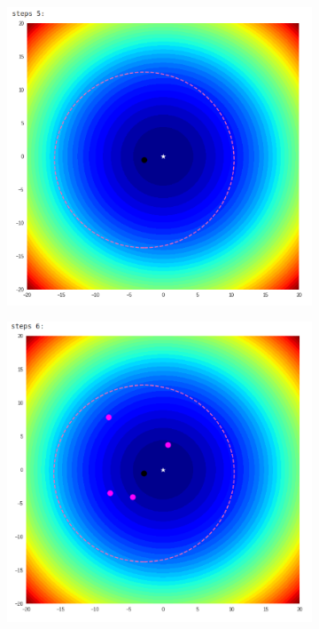 \documentclass{book}
\begin{document}
\begin{itemize}
\begin{figure}[H]
\begin{figure}[H]
\begin{minipage}[c]{0.3\textwidth}
            \end{minipage}
            \begin{minipage}[c]{0.3\textwidth}
                \centering
                \includegraphics[width=\textwidth]{images/one_plus_lambda_ex_step_5.png}
            \end{minipage}
        \end{figure}
            \begin{figure}[H]
            \begin{minipage}[c]{0.45\textwidth}
                \centering
                \includegraphics[width=\textwidth]{images/one_plus_lambda_ex_step_6.png}

\end{minipage}
\end{figure}
\end{figure}
\end{itemize}
\end{document}
